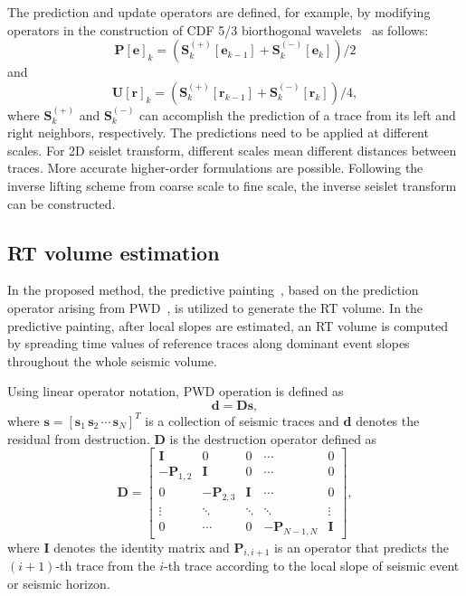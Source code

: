     The prediction and update operators are defined, for example, by modifying 
    operators in the construction of CDF 5/3 biorthogonal 
    wavelets~\cite[]{cohen1992biorthogonal} as follows:
    \begin{equation}
        \label{P}
        \mathbf{P[e]}_k = \left(\mathbf{S}_k^{(+)}[\mathbf{e}_{k-1}]+
        \mathbf{S}_k^{(-)}[\mathbf{e}_{k}] \right) / 2
    \end{equation}
    and
    \begin{equation}
        \label{U}
        \mathbf{U[r]}_k = \left(\mathbf{S}_k^{(+)}[\mathbf{r}_{k-1}]+
        \mathbf{S}_k^{(-)}[\mathbf{r}_{k}] \right) / 4,
    \end{equation}
    where $\mathbf{S}_k^{(+)}$ and $\mathbf{S}_k^{(-)}$ can accomplish the 
    prediction of a trace from its left and right neighbors, respectively. 
    The predictions need to be applied at different scales. 
    For 2D seislet transform, different scales mean different distances 
    between traces. 
    More accurate higher-order formulations are possible. 
    Following the inverse lifting scheme from coarse scale to fine scale, 
    the inverse seislet transform can be constructed.

\subsection{RT volume estimation}
    In the proposed method, the predictive painting~\cite[]{fomel2010predictive}, 
    based on the prediction operator arising from 
    PWD~\cite[]{fomel2002applications}, is utilized to generate the RT volume. 
    In the predictive painting, after local slopes are estimated, an RT volume 
    is computed by spreading time values of reference traces along dominant 
    event slopes throughout the whole seismic volume.

    Using linear operator notation, PWD operation is defined as
    \begin{equation}
        \mathbf{d} = \mathbf{D}{}\mathbf{s},
    \end{equation}
    where $\mathbf{s} =[\mathbf{s}_1 \,\mathbf{s}_2 \,\cdots\, \mathbf{s}_N]^T$ 
    is a collection of seismic traces and $\mathbf{d}$ denotes the residual from 
    destruction. $\mathbf{D}$ is the destruction operator defined as 
    \begin{equation}
        \label{pred}
        \mathbf{D}=
        \begin{bmatrix}
            \mathbf{I} & 0 & 0 & \cdots & 0 \\
            -\mathbf{P}_{1,2} & \mathbf{I} & 0 & \cdots & 0 \\
            0 & -\mathbf{P}_{2,3} & \mathbf{I} & \cdots & 0 \\
            \vdots & \ddots & \ddots & \ddots & \vdots \\
            0 & \cdots & 0 & -\mathbf{P}_{N-1,N} & \mathbf{I}
        \end{bmatrix},
    \end{equation}
    where $\mathbf{I}$ denotes the identity matrix and $\mathbf{P}_{i,i+1}$ is 
    an operator that predicts the $(i+1)$-th trace from the $i$-th trace 
    according to the local slope of seismic event or seismic horizon.

